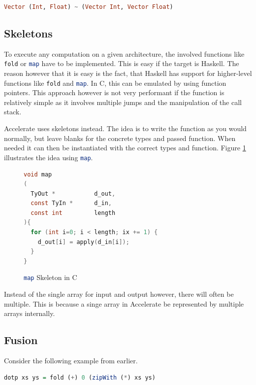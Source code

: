 \documentclass[a4paper,bibliography=totocnumbered,parskip,headsepline]{scrbook}
\begin{document}
\begin{lstlisting}[language=haskell]
Vector (Int, Float) ~ (Vector Int, Vector Float)
\end{lstlisting}

\subsection{Skeletons}
To execute any computation on a given architecture, the involved functions like \lstinline[language=haskell]!fold! or \lstinline[language=haskell]!map! have to be implemented.
This is easy if the target is Haskell.
The reason however that it is easy is the fact, that Haskell has support for higher-level functions like \lstinline[language=haskell]!fold! and \lstinline[language=haskell]!map!.
In C, this can be emulated by using function pointers.
This approach however is not very performant if the function is relatively simple as it involves multiple jumps and the manipulation of the call stack.

Accelerate uses skeletons instead.
The idea is to write the function as you would normally, but leave blanks for the concrete types and passed function.
When needed it can then be instantiated with the correct types and function.
Figure \ref{fig:mapskelC} illustrates the idea using \lstinline[language=haskell]!map!.

\begin{figure}
\begin{lstlisting}[language=C]
void map
(
  TyOut *           d_out,
  const TyIn *      d_in,
  const int         length
){
  for (int i=0; i < length; ix += 1) {
    d_out[i] = apply(d_in[i]);
  }
}
\end{lstlisting}
\caption{\lstinline[language=haskell]!map! Skeleton in C}
\label{fig:mapskelC}
\end{figure}

Instead of the single array for input and output however, there will often be multiple.
This is because a singe array in Accelerate be represented by multiple arrays internally.

\subsection{Fusion}
Consider the following example from earlier.

\begin{lstlisting}[language=haskell]
dotp xs ys = fold (+) 0 (zipWith (*) xs ys)
\end{lstlisting}
\end{document}
